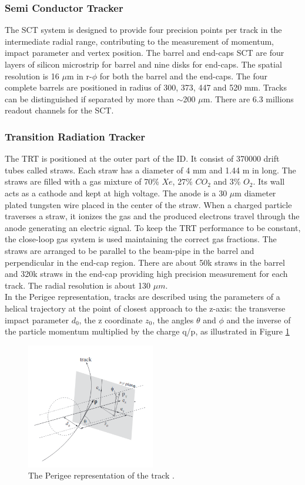 \subsubsection{Semi Conductor Tracker}
\label{chap2:ATLAS:ITK:SCT}
The SCT system is designed to provide four precision points per track in the intermediate radial range, contributing to the measurement of momentum, impact parameter and vertex position. The barrel and end-caps SCT are four layers of silicon microstrip for barrel and nine disks for end-caps. The spatial resolution is 16 $\mu$m in r-$\phi$ for both the barrel and the end-caps. The four complete barrels are positioned in radius of 300, 373, 447 and 520 mm. Tracks can be distinguished if separated by more than $\sim$200 $\mu$m. There are 6.3 millions readout channels for the SCT.
\subsubsection{Transition Radiation Tracker}
The TRT is positioned at the outer part of the ID. It consist of 370000 drift tubes called straws. Each straw has a diameter of 4 mm and 1.44 m in long. The straws are filled with a gas mixture of 70\% $Xe$, 27\% $CO_2$ and 3\% $O_2$. Its wall acts as a cathode and kept at high voltage. The anode is a 30 $\mu$m diameter plated tungsten wire placed in the center of the straw. When a charged particle traverses a straw, it ionizes the gas and the produced electrons travel through the anode generating an electric signal. To keep the TRT performance to be constant, the close-loop gas system is used maintaining the correct gas fractions. The straws are arranged to be parallel to the beam-pipe in the barrel and perpendicular in the end-cap region. There are about 50k straws in the barrel and 320k straws in the end-cap providing high precision measurement for each track. The radial resolution is about 130 $\mu m$. \\
In the Perigee representation, tracks are described using the parameters of a helical trajectory at the point of closest approach to the z-axis: the transverse impact parameter $d_0$, the z coordinate $z_0$, the angles $\theta$ and $\phi$ and the inverse of the particle momentum multiplied by the charge q/p, as illustrated in Figure \ref{fig:chap2:ATLAS:ITK:Trk}
\begin{figure}[ht]
    \centering
    \includegraphics[width=0.5\textwidth]{Ch2/Img/Track.png}
    \caption{The Perigee representation of the track \cite{Track_schema}.}
    \label{fig:chap2:ATLAS:ITK:Trk}
\end{figure}
